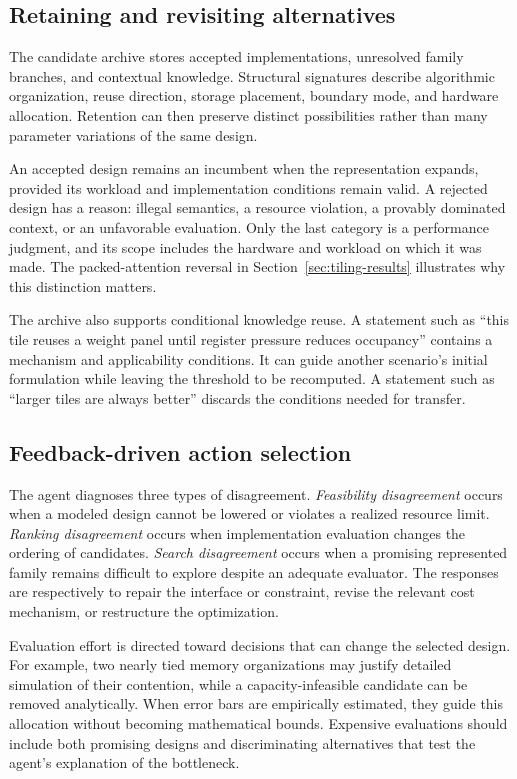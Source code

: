 \subsection{Retaining and revisiting alternatives}
The candidate archive stores accepted implementations, unresolved family branches, and contextual knowledge. Structural signatures describe algorithmic organization, reuse direction, storage placement, boundary mode, and hardware allocation. Retention can then preserve distinct possibilities rather than many parameter variations of the same design.

An accepted design remains an incumbent when the representation expands, provided its workload and implementation conditions remain valid. A rejected design has a reason: illegal semantics, a resource violation, a provably dominated context, or an unfavorable evaluation. Only the last category is a performance judgment, and its scope includes the hardware and workload on which it was made. The packed-attention reversal in Section~\ref{sec:tiling-results} illustrates why this distinction matters.

The archive also supports conditional knowledge reuse. A statement such as ``this tile reuses a weight panel until register pressure reduces occupancy'' contains a mechanism and applicability conditions. It can guide another scenario's initial formulation while leaving the threshold to be recomputed. A statement such as ``larger tiles are always better'' discards the conditions needed for transfer.

\subsection{Feedback-driven action selection}
The agent diagnoses three types of disagreement. \emph{Feasibility disagreement} occurs when a modeled design cannot be lowered or violates a realized resource limit. \emph{Ranking disagreement} occurs when implementation evaluation changes the ordering of candidates. \emph{Search disagreement} occurs when a promising represented family remains difficult to explore despite an adequate evaluator. The responses are respectively to repair the interface or constraint, revise the relevant cost mechanism, or restructure the optimization.

Evaluation effort is directed toward decisions that can change the selected design. For example, two nearly tied memory organizations may justify detailed simulation of their contention, while a capacity-infeasible candidate can be removed analytically. When error bars are empirically estimated, they guide this allocation without becoming mathematical bounds. Expensive evaluations should include both promising designs and discriminating alternatives that test the agent's explanation of the bottleneck.

